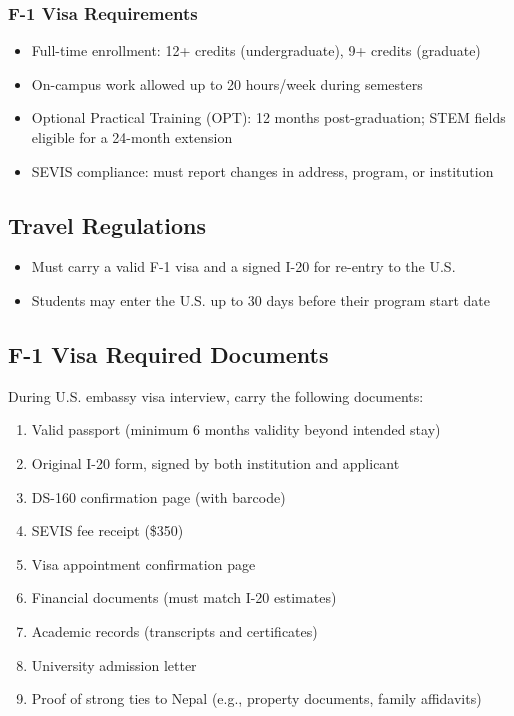 \subsubsection{F-1 Visa Requirements}
\begin{itemize}[label=--]
    \item Full-time enrollment: 12+ credits (undergraduate), 9+ credits (graduate)
    \item On-campus work allowed up to 20 hours/week during semesters
    \item Optional Practical Training (OPT): 12 months post-graduation; STEM fields eligible for a 24-month extension
    \item SEVIS compliance: must report changes in address, program, or institution
\end{itemize}

\subsection{Travel Regulations}
\begin{itemize}[label=--]
    \item Must carry a valid F-1 visa and a signed I-20 for re-entry to the U.S.
    \item Students may enter the U.S. up to 30 days before their program start date
\end{itemize}

\subsection{F-1 Visa Required Documents}
During U.S. embassy visa interview, carry the following documents:

\begin{enumerate}
    \item Valid passport (minimum 6 months validity beyond intended stay)
    \item Original I-20 form, signed by both institution and applicant
    \item DS-160 confirmation page (with barcode)
    \item SEVIS fee receipt (\$350)
    \item Visa appointment confirmation page
    \item Financial documents (must match I-20 estimates)
    \item Academic records (transcripts and certificates)
    \item University admission letter
    \item Proof of strong ties to Nepal (e.g., property documents, family affidavits)
\end{enumerate}

